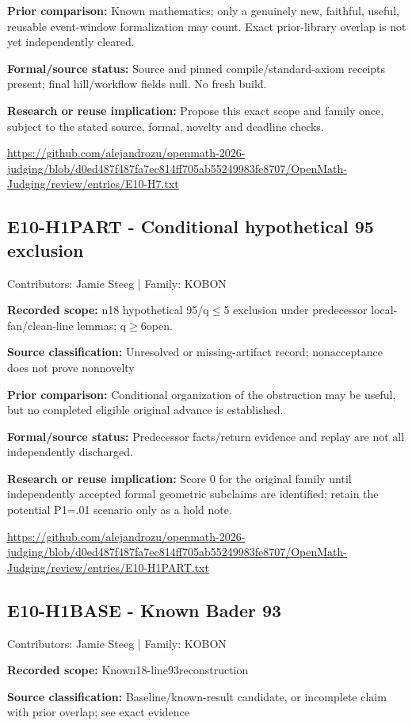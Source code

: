 \documentclass[11pt,a4paper]{article}
\begin{document}
\textbf{Prior comparison:} Known mathematics; only a genuinely new, faithful, useful, reusable event-window formalization may count. Exact prior-library overlap is not yet independently cleared.

\textbf{Formal/source status:} Source and pinned compile/standard-axiom receipts present; final hill/workflow fields null. No fresh build.

\textbf{Research or reuse implication:} Propose this exact scope and family once, subject to the stated source, formal, novelty and deadline checks.

{\small \url{https://github.com/alejandrozu/openmath-2026-judging/blob/d0ed487f487fa7ec814ff705ab55249983fe8707/OpenMath-Judging/review/entries/E10-H7.txt}\par}

\begin{samepage}
\subsection{E10-H1PART  -  Conditional hypothetical 95 exclusion}
{\small Contributors: Jamie Steeg | Family: KOBON\par}

\textbf{Recorded scope:} n18 hypothetical 95/q\ensuremath{\leq}5 exclusion under predecessor local-fan/clean-line lemmas; q\ensuremath{\geq}6open.

\end{samepage}
\textbf{Source classification:} Unresolved or missing-artifact record; nonacceptance does not prove nonnovelty

\textbf{Prior comparison:} Conditional organization of the obstruction may be useful, but no completed eligible original advance is established.

\textbf{Formal/source status:} Predecessor facts/return evidence and replay are not all independently discharged.

\textbf{Research or reuse implication:} Score 0 for the original family until independently accepted formal geometric subclaims are identified; retain the potential P1=.01 scenario only as a hold note.

{\small \url{https://github.com/alejandrozu/openmath-2026-judging/blob/d0ed487f487fa7ec814ff705ab55249983fe8707/OpenMath-Judging/review/entries/E10-H1PART.txt}\par}

\begin{samepage}
\subsection{E10-H1BASE  -  Known Bader 93}
{\small Contributors: Jamie Steeg | Family: KOBON\par}

\textbf{Recorded scope:} Known18-line93reconstruction

\end{samepage}
\textbf{Source classification:} Baseline/known-result candidate, or incomplete claim with prior overlap; see exact evidence
\end{document}
